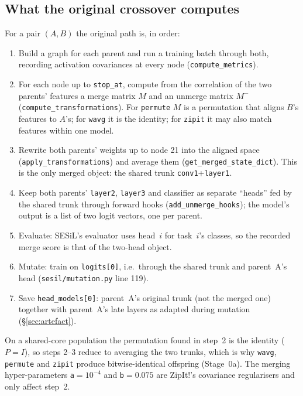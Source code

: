 \documentclass[11pt,a4paper]{article}
\newcommand{\code}[1]{\texttt{#1}}
\begin{document}
\subsection{What the original crossover computes}
For a pair $(A,B)$ the original path is, in order:
\begin{enumerate}[nosep]
\item Build a graph for each parent and run a training batch through both, recording activation covariances at every node (\code{compute\_metrics}).
\item For each node up to \code{stop\_at}, compute from the correlation of the two parents' features a merge matrix $M$ and an unmerge matrix $M^{-}$ (\code{compute\_transformations}). For \code{permute} $M$ is a permutation that aligns $B$'s features to $A$'s; for \code{wavg} it is the identity; for \code{zipit} it may also match features within one model.
\item Rewrite both parents' weights up to node 21 into the aligned space (\code{apply\_transformations}) and average them (\code{get\_merged\_state\_dict}). This is the only merged object: the shared trunk \code{conv1}+\code{layer1}.
\item Keep both parents' \code{layer2}, \code{layer3} and classifier as separate ``heads'' fed by the shared trunk through forward hooks (\code{add\_unmerge\_hooks}); the model's output is a list of two logit vectors, one per parent.
\item Evaluate: SESiL's evaluator uses head~$i$ for task~$i$'s classes, so the recorded merge score is that of the two-head object.
\item Mutate: train on \code{logits[0]}, i.e.\ through the shared trunk and parent~A's head (\code{sesil/mutation.py} line 119).
\item Save \code{head\_models[0]}: parent~A's original trunk (not the merged one) together with parent~A's late layers as adapted during mutation (\S\ref{sec:artefact}).
\end{enumerate}
On a shared-core population the permutation found in step~2 is the identity ($P=I$), so steps 2--3 reduce to averaging the two trunks, which is why \code{wavg}, \code{permute} and \code{zipit} produce bitwise-identical offspring (Stage~0a). The merging hyper-parameters \code{a}$=10^{-4}$ and \code{b}$=0.075$ are ZipIt!'s covariance regularisers and only affect step~2.
\end{document}
